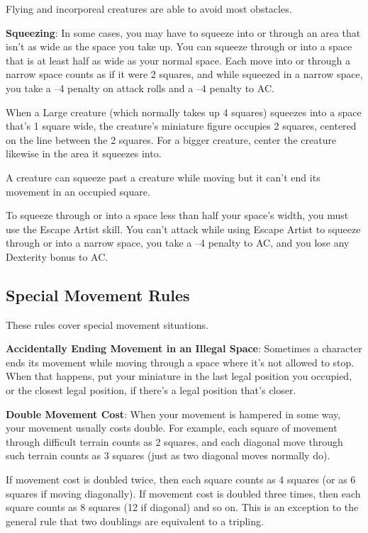Flying and incorporeal creatures are able to avoid most obstacles.
				
\textbf{Squeezing}: In some cases, you may have to squeeze into or through an area that isn't as wide as the space you take up. You can squeeze through or into a space that is at least half as wide as your normal space. Each move into or through a narrow space counts as if it were 2 squares, and while squeezed in a narrow space, you take a --4 penalty on attack rolls and a --4 penalty to AC.
				
When a Large creature (which normally takes up 4 squares) squeezes into a space that's 1 square wide, the creature's miniature figure occupies 2 squares, centered on the line between the 2 squares. For a bigger creature, center the creature likewise in the area it squeezes into.
				
A creature can squeeze past a creature while moving but it can't end its movement in an occupied square.
				
To squeeze through or into a space less than half your space's width, you must use the Escape Artist skill. You can't attack while using Escape Artist to squeeze through or into a narrow space, you take a --4 penalty to AC, and you lose any Dexterity bonus to AC.
				
\subsection{Special Movement Rules}

				
These rules cover special movement situations.
				
\textbf{Accidentally Ending Movement in an Illegal Space}: Sometimes a character ends its movement while moving through a space where it's not allowed to stop. When that happens, put your miniature in the last legal position you occupied, or the closest legal position, if there's a legal position that's closer.
				
\textbf{Double Movement Cost}: When your movement is hampered in some way, your movement usually costs double. For example, each square of movement through difficult terrain counts as 2 squares, and each diagonal move through such terrain counts as 3 squares (just as two diagonal moves normally do).
				
If movement cost is doubled twice, then each square counts as 4 squares (or as 6 squares if moving diagonally). If movement cost is doubled three times, then each square counts as 8 squares (12 if diagonal) and so on. This is an exception to the general rule that two doublings are equivalent to a tripling.
				
